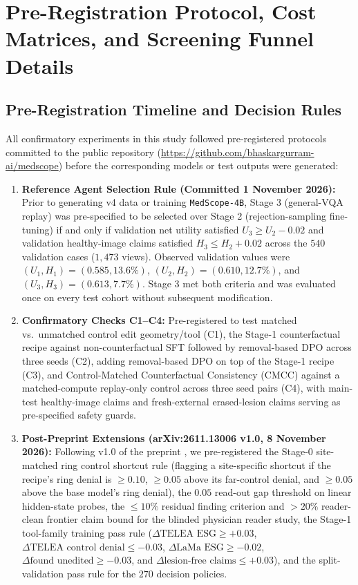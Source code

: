 \documentclass{article} %
\begin{document}



\newpage
\appendix

\section{Pre-Registration Protocol, Cost Matrices, and Screening Funnel Details}
\label{app:prereg_and_funnel}

\subsection{Pre-Registration Timeline and Decision Rules}
All confirmatory experiments in this study followed pre-registered protocols committed to the public repository (\url{https://github.com/bhaskargurram-ai/medscope}) before the corresponding models or test outputs were generated:
\begin{enumerate}[leftmargin=*,nosep]
    \item \textbf{Reference Agent Selection Rule (Committed 1 November 2026):} Prior to generating v4 data or training \texttt{MedScope-4B}, Stage 3 (general-VQA replay) was pre-specified to be selected over Stage 2 (rejection-sampling fine-tuning) if and only if validation net utility satisfied $U_3 \ge U_2 - 0.02$ and validation healthy-image claims satisfied $H_3 \le H_2 + 0.02$ across the $540$ validation cases ($1,473$ views). Observed validation values were $(U_1, H_1) = (0.585, 13.6\%)$, $(U_2, H_2) = (0.610, 12.7\%)$, and $(U_3, H_3) = (0.613, 7.7\%)$. Stage 3 met both criteria and was evaluated once on every test cohort without subsequent modification.
    \item \textbf{Confirmatory Checks C1--C4:} Pre-registered to test matched vs.\ unmatched control edit geometry/tool (C1), the Stage-1 counterfactual recipe against non-counterfactual SFT followed by removal-based DPO across three seeds (C2), adding removal-based DPO on top of the Stage-1 recipe (C3), and Control-Matched Counterfactual Consistency (CMCC) against a matched-compute replay-only control across three seed pairs (C4), with main-test healthy-image claims and fresh-external erased-lesion claims serving as pre-specified safety guards.
    \item \textbf{Post-Preprint Extensions (arXiv:2611.13006 v1.0, 8 November 2026):} Following v1.0 of the preprint \citep{gurram2026medscope}, we pre-registered the Stage-0 site-matched ring control shortcut rule (flagging a site-specific shortcut if the recipe's ring denial is $\ge 0.10$, $\ge 0.05$ above its far-control denial, and $\ge 0.05$ above the base model's ring denial), the $0.05$ read-out gap threshold on linear hidden-state probes, the $\le 10\%$ residual finding criterion and $>20\%$ reader-clean frontier claim bound for the blinded physician reader study, the Stage-1 tool-family training pass rule ($\Delta\text{TELEA ESG} \ge +0.03$, $\Delta\text{TELEA control denial} \le -0.03$, $\Delta\text{LaMa ESG} \ge -0.02$, $\Delta\text{found unedited} \ge -0.03$, and $\Delta\text{lesion-free claims} \le +0.03$), and the split-validation pass rule for the $270$ decision policies.
\end{enumerate}
\end{document}
